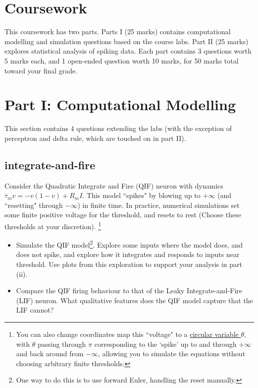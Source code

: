 \documentclass[11pt]{article}
\begin{document}
{}

\section*{Coursework}

This coursework has two parts.
Parts I (25 marks) contains computational modelling and simulation questions based on the course labs. 
Part II (25 marks) explores statistical analysis of spiking data. 
Each part contains 3 questions worth 5 marks each, and 1 open-ended question worth 10 marks, for 50 marks total toward your final grade. 

\clearpage
\section*{Part I: Computational Modelling}

This section contains 4 questions extending the labs (with the exception of perceptron and delta rule, which are touched on in part II). 

\subsection{integrate-and-fire ~\normalfont [5 marks]}
Consider the Quadratic Integrate and Fire (QIF) neuron with dynamics $\dot \tau_m v = -v(1-v) + R_m I$. This model ``spikes" by blowing up to $+\infty$ (and ``resetting" through $-\infty$) in finite time. In practice, numerical simulations set some finite positive voltage for the threshold, and resets to rest (Choose these thresholds at your discretion). \footnote{You can also change coordinates map this ``voltage" to a \href{https://en.wikipedia.org/wiki/Theta_model}{circular variable $\theta$}, with $\theta$ passing through $\pi$ corresponding to the `spike' up to and through $+\infty$ and back around from $-\infty$, allowing you to simulate the equations without choosing arbitrary finite thresholds.} 
\begin{itemize}
\item[\textbf{(i)}] 
Simulate the QIF model\footnote{One way to do this is to use forward Euler, handling the reset manually.}. Explore some inputs where the model does, and does not spike, and explore how it integrates and responds to inputs near threshold. Use plots from this exploration to support your analysis in part (ii).
\item[\textbf{(ii)}]
Compare the QIF firing behaviour to that of the Leaky Integrate-and-Fire (LIF) neuron. What qualitative features does the QIF model capture that the LIF cannot? 
\end{itemize}
\end{document}
